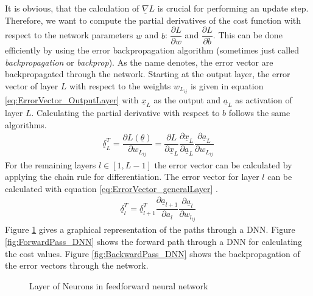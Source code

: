 \documentclass[12pt,DIV14,BCOR12mm,a4paper,footexclude,headinclude,halfparskip-,twoside,openright,cleardoubleempty,idxtotoc,bibtotoc,listtotoc]{scrreprt} %
\numberwithin{equation}{chapter}
\begin{document}
It is obvious, that the calculation of $\underline{\nabla}L$ is crucial for performing an update step. Therefore, we want to compute the partial derivatives of the cost function with respect to the network parameters $w$ and $b$: $\dfrac{\partial L}{\partial w}$ and $\dfrac{\partial L}{\partial b}$. This can be done efficiently by using the error backpropagation algorithm (sometimes just called \textit{backpropagation} or \textit{backprop}). As the name denotes, the error vector are backpropagated through the network. Starting at the output layer, the  error vector of layer $L$ with respect to the weights $w_{L_{ij}}$ is given in equation \ref{eq:ErrorVector_OutputLayer} with $\underline{x}_{L}$ as the output and $\underline{a}_{L}$ as activation of layer $L$. Calculating the partial derivative with respect to $b$ follows the same algorithms.
\begin{align}
	\underline{\delta}_{L}^{T} = \dfrac{\partial L(\underline{\theta})}{\partial w_{L_{ij}}} = \dfrac{\partial L}{\partial \underline{x}_{L}}\dfrac{\partial \underline{x}_{L}}{\partial \underline{a}_{L}}\dfrac{\partial \underline{a}_{L}}{\partial w_{L_{ij}}}\label{eq:ErrorVector_OutputLayer}
\end{align}
For the remaining layers $l \in [1, L-1]$ the error vector can be calculated by applying the chain rule for differentiation. The error vector for layer $l$ can be calculated with equation \ref{eq:ErrorVector_generalLayer} \cite{LectureNotes_DeepLearning}.
\begin{align}
	\underline{\delta}_{l}^{T} = \underline{\delta}_{l+1}^{T}\dfrac{\partial \underline{a}_{l+1}}{\partial a_{l}}\dfrac{\partial \underline{a}_{l}}{\partial w_{l_{ij}}}\label{eq:ErrorVector_generalLayer}
\end{align}
Figure \ref{fig:Backprop_DNN} gives a graphical representation of the paths through a DNN. Figure \ref{fig:ForwardPass_DNN} shows the forward path through a DNN for calculating the cost values. Figure \ref{fig:BackwardPass_DNN} shows the backpropagation of the error vectors through the network.
\begin{figure}[htb!]
	\centering
	\qquad
	\caption{Layer of Neurons in feedforward neural network}
	\label{fig:Backprop_DNN}
\end{figure}
\end{document}
